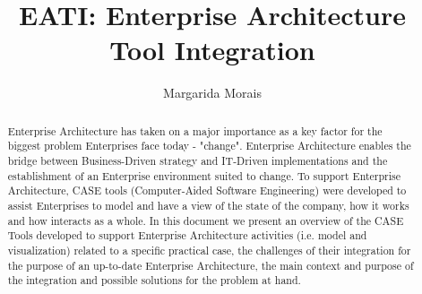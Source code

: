 \documentclass[runningheads]{llncs}
\begin{document}
%
\title{EATI: Enterprise Architecture Tool Integration}
%
%
\author{Margarida Morais}

%
%
%
\maketitle              %
%
\begin{abstract}
Enterprise Architecture has taken on a major importance as a key factor for the biggest problem Enterprises face today - "change". 
Enterprise Architecture enables the bridge between Business-Driven strategy and IT-Driven implementations and the establishment of an Enterprise environment suited to change.
To support Enterprise Architecture, CASE tools (Computer-Aided Software Engineering) were developed to assist Enterprises to model and have a view of the state of the company, how it works and how interacts as a whole. 
In this document we present an overview of the CASE Tools developed to support Enterprise Architecture activities (i.e. model and visualization) related to a specific practical case, the challenges of their integration for the purpose of an up-to-date Enterprise Architecture, the main context and purpose of the integration and possible solutions for the problem at hand.
\end{abstract}
%
%
%
\end{document}
